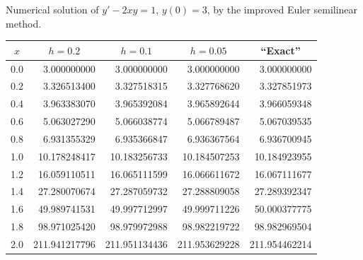 \begin{examplesolution}
\begin{newtable}
  \label{table:3.2.5} Numerical solution of $y'-2xy=1$, $y(0)=3$, by the improved Euler semilinear
  method.
  \begin{center}
    \begin{tabular}{|c|r|r|r|r|}
      \hline
      \multicolumn{1}{|c|}{$x$} & \multicolumn{1}{|c|}{$h=0.2$} & \multicolumn{1}{|c|}{$h=0.1$} & \multicolumn{1}{|c|}{$h=0.05$} & \multicolumn{1}{|c|}{``Exact''} \\
      \hline
      0.0                       & 3.000000000                   & 3.000000000                   & 3.000000000                    & 3.000000000                     \\
      0.2                       & 3.326513400                   & 3.327518315                   & 3.327768620                    & 3.327851973                     \\
      0.4                       & 3.963383070                   & 3.965392084                   & 3.965892644                    & 3.966059348                     \\
      0.6                       & 5.063027290                   & 5.066038774                   & 5.066789487                    & 5.067039535                     \\
      0.8                       & 6.931355329                   & 6.935366847                   & 6.936367564                    & 6.936700945                     \\
      1.0                       & 10.178248417                  & 10.183256733                  & 10.184507253                   & 10.184923955                    \\
      1.2                       & 16.059110511                  & 16.065111599                  & 16.066611672                   & 16.067111677                    \\
      1.4                       & 27.280070674                  & 27.287059732                  & 27.288809058                   & 27.289392347                    \\
      1.6                       & 49.989741531                  & 49.997712997                  & 49.999711226                   & 50.000377775                    \\
      1.8                       & 98.971025420                  & 98.979972988                  & 98.982219722                   & 98.982969504                    \\
      2.0                       & 211.941217796                 & 211.951134436                 & 211.953629228                  & 211.954462214                   \\
      \hline
    \end{tabular}
  \end{center}
\end{newtable}
\end{examplesolution}

